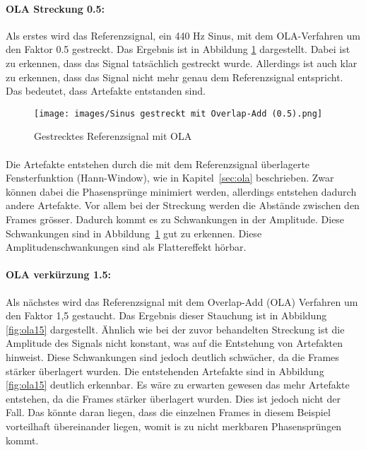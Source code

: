 \paragraph{OLA Streckung 0.5:}
Als erstes wird das Referenzsignal, ein 440 Hz Sinus, mit dem OLA-Verfahren um den Faktor 0.5 gestreckt. Das Ergebnis ist in Abbildung \ref{fig:ola05} dargestellt. Dabei ist zu erkennen, dass das Signal tatsächlich gestreckt wurde. Allerdings ist auch klar zu erkennen, dass das Signal nicht mehr genau dem Referenzsignal entspricht. Das bedeutet, dass Artefakte entstanden sind.

\begin{figure}[H]
    \centering
    \texttt{[image: images/Sinus gestreckt mit Overlap-Add (0.5).png]}
    \caption{Gestrecktes Referenzsignal mit OLA}
    \label{fig:ola05}
\end{figure}

\paragraph{}
Die Artefakte entstehen durch die mit dem Referenzsignal überlagerte Fensterfunktion (Hann-Window), wie in Kapitel~\ref{sec:ola} beschrieben. Zwar können dabei die Phasensprünge minimiert werden, allerdings entstehen dadurch andere Artefakte. Vor allem bei der Streckung werden die Abstände zwischen den Frames grösser. Dadurch kommt es zu Schwankungen in der Amplitude. Diese Schwankungen sind in Abbildung~\ref{fig:ola05} gut zu erkennen. Diese Amplitudenschwankungen sind als Flattereffekt hörbar.

\paragraph{OLA verkürzung 1.5:}
Als nächstes wird das Referenzsignal mit dem Overlap-Add (OLA) Verfahren um den Faktor 1,5 gestaucht. Das Ergebnis dieser Stauchung ist in Abbildung \ref{fig:ola15} dargestellt. Ähnlich wie bei der zuvor behandelten Streckung ist die Amplitude des Signals nicht konstant, was auf die Entstehung von Artefakten hinweist. Diese Schwankungen sind jedoch deutlich schwächer, da die Frames stärker überlagert wurden. Die entstehenden Artefakte sind in Abbildung \ref{fig:ola15} deutlich erkennbar. Es wäre zu erwarten gewesen das mehr Artefakte entstehen, da die Frames stärker überlagert wurden. Dies ist jedoch nicht der Fall. Das könnte daran liegen, dass die einzelnen Frames in diesem Beispiel vorteilhaft übereinander liegen, womit is zu nicht merkbaren Phasensprüngen kommt.

